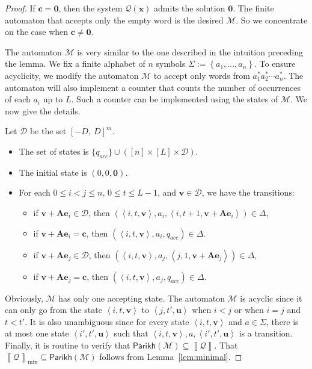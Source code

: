 \documentclass[10pt,a4paper]{article}
\theoremstyle{definition}
\theoremstyle{remark}
\newcommand{\cD}{\mathcal{D}}
\newcommand{\cM}{\mathcal{M}}
\newcommand{\cQ}{\mathcal{Q}}
\newcommand{\bfA}{\mathbf{A}}
\newcommand{\bfc}{\mathbf{c}}
\newcommand{\bfe}{\mathbf{e}}
\newcommand{\bfu}{\mathbf{u}}
\newcommand{\bfv}{\mathbf{v}}
\newcommand{\bfx}{\mathbf{x}}
\newcommand{\bfzero}{\mathbf{0}}
\newcommand{\set}[1]         {\left\{ #1 \right\}}
\newcommand{\tuple}[1]       {\left\langle #1 \right\rangle}
\newcommand{\intsinterval}[1]{{\left[ #1 \right]}}
\newcommand{\intinterval}[2] {{\left[ #1 ,\ #2 \right]}}
\newcommand{\parikh}[1] {\mathsf{Parikh}\left( #1 \right)}
\newcommand{\sol}[1] {\left\llbracket #1 \right\rrbracket}
\newcommand{\solmin}[1] {\left\llbracket #1 \right\rrbracket_\text{min}}
\newcommand{\unit}[1] {\bfe_{ #1 }}
\begin{document}
\begin{proof}
If $\bfc = \bfzero$, then the system $\cQ(\bfx)$ admits the
solution $\bfzero$.
The finite automaton that accepts only the empty word is the desired $\cM$.
So we concentrate on the case when $\bfc\neq \bfzero$.

The automaton $\cM$ is very similar to the one described in the intuition preceding the lemma.
We fix a finite alphabet of $n$ symbols $\Sigma := \set{a_1, \ldots, a_{n}}$.
To ensure acyclicity, we modify the automaton $\cM$ to accept only words from $a_1^*a_2^*\cdots a_n^*$. The automaton will also implement a counter that counts the number of occurrences of each $a_i$ up to $L$. Such a counter can be implemented using the states of $\cM$.
We now give the details.

Let $\cD$ be the set $\intinterval{-D}{D}^{m}$.
\begin{itemize}
\item 
The set of states is 
$\{q_{acc}\}\cup(\intsinterval{n}\times\intsinterval{L} \times \cD)$.
\item
The initial state is $(0,0,\bfzero)$.
\item 
For each $0\leq i<j \leq n$, $0\leq t\leq L-1$,
and $\bfv \in \cD$,
we have the transitions:
\begin{itemize}
\item 
if $\bfv + \bfA\unit{i} \in \cD$,
then $(\tuple{i,t, \bfv}, a_i, \tuple{i,t+1, \bfv + \bfA\unit{i}}) \in \Delta$, 
\item 
if $\bfv + \bfA\unit{i}  = \bfc$,
then $(\tuple{i, t,\bfv}, a_i, q_{acc}) \in \Delta$.

\item 
if $\bfv + \bfA\unit{j} \in \cD$,
then $(\tuple{i,t, \bfv}, a_j, \tuple{j,1, \bfv + \bfA\unit{j}}) \in \Delta$, 
\item 
if $\bfv + \bfA\unit{j}  = \bfc$,
then $(\tuple{i, t,\bfv}, a_j, q_{acc}) \in \Delta$.
\end{itemize}
\end{itemize}
Obviously, $\cM$ has only one accepting state.
The automaton $\cM$ is acyclic since it can only go from the state
$\tuple{i,t, \bfv}$ to $\tuple{j,t',\bfu}$
when $i< j$ or when $i=j$ and $t<t'$.
It is also unambiguous since
for every state $\tuple{i,t,\bfv}$ and $a\in \Sigma$, there is at most one state $\tuple{i',t',\bfu}$
such that $\tuple{i,t,\bfv},a,\tuple{i',t',\bfu}$ is a transition.
Finally, it is routine to verify that
$\parikh{\cM}\subseteq \sol{\cQ}$.
That $\solmin{\cQ}\subseteq \parikh{\cM}$
follows from Lemma~\ref{lem:minimal}.
\end{proof}
\end{document}
